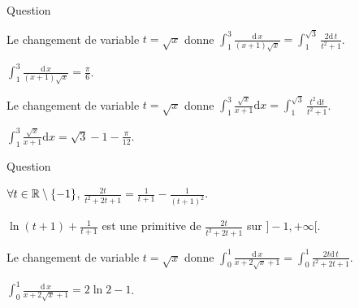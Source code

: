 \begin{multi}{Question}
    \item* Le changement de variable \(t=\sqrt{x}\) donne \(\displaystyle \int _{1}^{3}\frac{\mathrm{d}\, x}{(x+1)\sqrt{x}}=\int _{1}^{\sqrt{3}}\frac{2\mathrm{d}\, t}{t^2+1}\).
    \item* \(\displaystyle \int _1^3\frac{\mathrm{d}\, x}{(x+1)\sqrt{x}}=\frac{\pi}{6}\).
    \item Le changement de variable \(t=\sqrt{x}\) donne \(\displaystyle \int _1^3\frac{\sqrt{x}}{x+1}\mathrm{d}x=\int _1^{\sqrt{3}}\frac{t^2\, \mathrm{d}t}{t^2+1}\).
    \item \(\displaystyle \int _1^3\frac{\sqrt{x}}{x+1}\mathrm{d}x=\sqrt{3}-1-\frac{\pi}{12}\).
\end{multi}


\begin{multi}{Question}
    \item \(\forall t\in \mathbb{R}\setminus\{-1\}\), \(\displaystyle \frac{2t}{t^2+2t+1}=\frac{1}{t+1}-\frac{1}{(t+1)^2}\).
    \item \(\displaystyle \ln (t+1)+\frac{1}{t+1}\) est une primitive de \(\displaystyle \frac{2t}{t^2+2t+1}\) sur \(]-1,+\infty[\).
    \item* Le changement de variable \(t=\sqrt{x}\) donne \(\displaystyle \int _0^1\frac{\mathrm{d}\, x}{x+2\sqrt{x}+1}=\int _0^1\frac{2t\mathrm{d}\, t}{t^2+2t+1}\).
    \item* \(\displaystyle \int _0^1\frac{\mathrm{d}\, x}{x+2\sqrt{x}+1}=2\ln 2-1\).
\end{multi}


